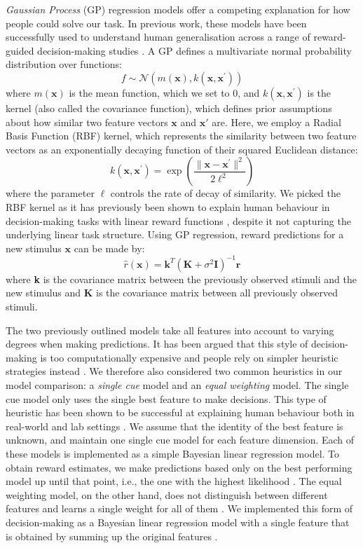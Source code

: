 \documentclass[10pt]{article}
\begin{document}
\emph{Gaussian Process} (GP) regression models \citep{schulz_tutorial_2018} offer a competing explanation for how people could solve our task. In previous work, these models have been successfully used to understand human generalisation across a range of reward-guided decision-making studies \citep{schulz_finding_2020}. A GP defines a multivariate normal probability distribution over functions: $$f \sim \mathcal{N}(m(\textbf{x}),k(\textbf{x},\textbf{x}^{\prime}))$$ where $m(\textbf{x})$ is the mean function, which we set to 0, and $k(\textbf{x},\textbf{x}^{\prime})$ is the kernel (also called the covariance function), which defines prior assumptions about how similar two feature vectors $\textbf{x}$ and $\textbf{x}'$ are. Here, we employ a Radial Basis Function (RBF) kernel, which represents the similarity between two feature vectors as an exponentially decaying function of their squared Euclidean distance: $$k(\textbf{x},\textbf{x}^{\prime}) = \exp \left( \dfrac{\lVert \textbf{x} - \textbf{x}^{\prime} \rVert^2}{2\ell^2} \right)$$ where the parameter $\ell$ controls the rate of decay of similarity. We picked the RBF kernel as it has previously been shown to explain human behaviour in decision-making tasks with linear reward functions \citep{stojic_its_2020}, despite it not capturing the underlying linear task structure. Using GP regression, reward predictions for a new stimulus $\mathbf{x}$ can be made by: $$\hat{r}(\textbf{x}) = \textbf{k}^T\left(\textbf{K} + \sigma^2\textbf{I}\right)^{-1} \textbf{r}$$ where \textbf{k} is the covariance matrix between the previously observed stimuli and the new stimulus and \textbf{K} is the covariance matrix between all previously observed stimuli.


The two previously outlined models take all features into account to varying degrees when making predictions. It has been argued that this style of decision-making is too computationally expensive and people rely on simpler heuristic strategies instead \citep{gigerenzer_heuristic_2011}. We therefore also considered two common heuristics in our model comparison: a \emph{single cue} model and an \emph{equal weighting} model. The single cue model only uses the single best feature to make decisions. This type of heuristic has been shown to be successful at explaining human behaviour both in real-world and lab settings \citep{gigerenzer_betting_1999,gigerenzer_heuristic_2011}. We assume that the identity of the best feature is unknown, and maintain one single cue model for each feature dimension. Each of these models is implemented as a simple Bayesian linear regression model. To obtain reward estimates, we make predictions based only on the best performing model up until that point, i.e., the one with the highest likelihood \citep{binz_heuristics_2022}. The equal weighting model, on the other hand, does not distinguish between different features and learns a single weight for all of them \citep{gigerenzer_heuristic_2011,dawes_linear_1974}. We implemented this form of  decision-making as a Bayesian linear regression model with a single feature that is obtained by summing up the original features \citep{binz_heuristics_2022}.
\end{document}
